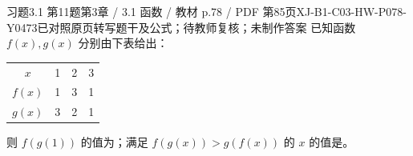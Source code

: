 \par\noindent\begin{minipage}{\linewidth}
\begin{bankitem}{习题3.1 第11题}{第3章 / 3.1 函数 / 教材 p.78 / PDF 第85页}{XJ-B1-C03-HW-P078-Y0473}{已对照原页转写题干及公式；待教师复核；未制作答案}
已知函数 $f(x),g(x)$ 分别由下表给出：
\begin{center}\begin{tabular}{c|rrr}\hline
$x$&1&2&3\\$f(x)$&1&3&1\\$g(x)$&3&2&1\\\hline
\end{tabular}\end{center}
则 $f(g(1))$ 的值为\blank；满足 $f(g(x))>g(f(x))$ 的 $x$ 的值是\blank。
\end{bankitem}
\end{minipage}\par\medskip
